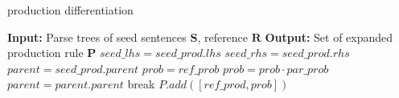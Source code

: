 \begin{algorithm}
  \caption{production differentiation}
  \begin{algorithmic}[1]
    \State \textbf{Input:} Parse trees of seed sentences $\textbf{S}$,
    reference \pcfg$\textbf{R}$
    \State \textbf{Output:} Set of expanded production rule $\textbf{P}$
        \State $seed\_lhs = seed\_prod.lhs$
        \State $seed\_rhs = seed\_prod.rhs$
            \State $parent = seed\_prod.parent$
            \State $prob = ref\_prob$
                  \State $prob = prob \cdot par\_prob$
                  \State $parent = parent.parent$
                  \State break
                \EndIf
              \EndFor  
            \EndWhile
            \State $P.add([ref\_prod, prob])$
          \EndIf
        \EndFor
      \EndFor
    \EndFor
  \end{algorithmic} 
\end{algorithm}
